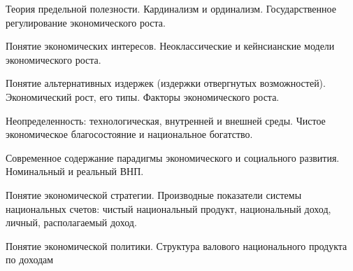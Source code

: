 \documentclass[
	14pt,
	a4paper,
	]
	{scrartcl}
\begin{document}
\vfill
\z 	Теория предельной полезности.  Кардинализм и ординализм.
 \vfill
\z 	Государственное регулирование экономического роста.
 \vfill

\vfill

\newpage


\shapk
{}
\setcounter{zad}{0}

\vfill
\z 	Понятие экономических интересов.
 \vfill
\z 	Неоклассические и кейнсианские модели экономического роста.
 \vfill

\vfill

\newpage


\shapk
{}
\setcounter{zad}{0}

\vfill
\z 	Понятие альтернативных издержек (издержки отвергнутых возможностей).
 \vfill
\z 	Экономический рост, его типы.  Факторы экономического роста.
 \vfill

\vfill

\newpage


\shapk
{}
\setcounter{zad}{0}

\vfill
\z 	Неопределенность: технологическая, внутренней и внешней среды.
 \vfill
\z 	Чистое экономическое благосостояние и национальное богатство.
 \vfill

\vfill

\newpage


\shapk
{}
\setcounter{zad}{0}

\vfill
\z 	Современное содержание парадигмы экономического и социального развития.
 \vfill
\z 	Номинальный и реальный ВНП.
 \vfill

\vfill

\newpage


\shapk
{}
\setcounter{zad}{0}

\vfill
\z 	Понятие экономической стратегии.
 \vfill
\z 	Производные показатели системы национальных счетов: чистый национальный продукт, национальный доход, личный, располагаемый доход.
 \vfill

\vfill

\newpage


\shapk
{}
\setcounter{zad}{0}

\vfill
\z 	Понятие экономической политики.
 \vfill
\z 	Структура валового национального продукта по доходам
 \vfill

\vfill

\newpage


\shapk
{}
\setcounter{zad}{0}
\end{document}
